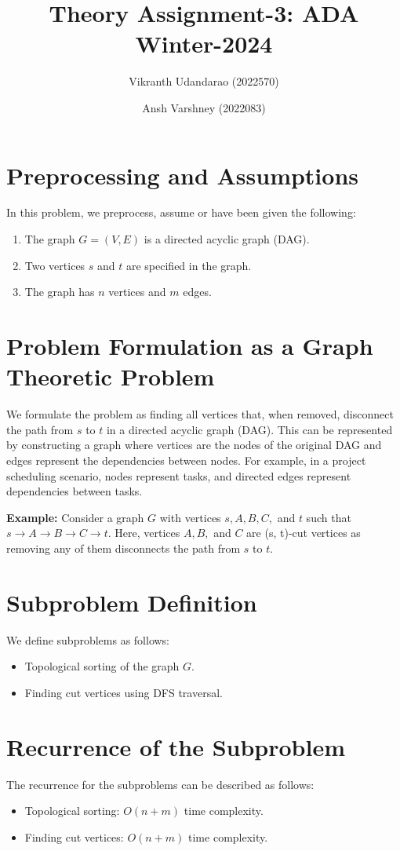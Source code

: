 \documentclass{article}
\title{Theory Assignment-3: ADA Winter-2024}
\author{Vikranth Udandarao (2022570) \and Ansh Varshney (2022083)}
\date{}
\begin{document}
\maketitle

\section{Preprocessing and Assumptions}
In this problem, we preprocess, assume or have been given the following:

\begin{enumerate}
    \item The graph $G = (V, E)$ is a directed acyclic graph (DAG).
    \item Two vertices $s$ and $t$ are specified in the graph.
    \item The graph has $n$ vertices and $m$ edges.
\end{enumerate}

\section{Problem Formulation as a Graph Theoretic Problem}
We formulate the problem as finding all vertices that, when removed, disconnect the path from $s$ to $t$ in a directed acyclic graph (DAG). This can be represented by constructing a graph where vertices are the nodes of the original DAG and edges represent the dependencies between nodes. For example, in a project scheduling scenario, nodes represent tasks, and directed edges represent dependencies between tasks.

\textbf{Example:} Consider a graph $G$ with vertices $s, A, B, C,$ and $t$ such that $s \rightarrow A \rightarrow B \rightarrow C \rightarrow t$. Here, vertices $A, B,$ and $C$ are (s, t)-cut vertices as removing any of them disconnects the path from $s$ to $t$.

\section{Subproblem Definition}
We define subproblems as follows:
\begin{itemize}
    \item Topological sorting of the graph $G$.
    \item Finding cut vertices using DFS traversal.
\end{itemize}

\section{Recurrence of the Subproblem}
The recurrence for the subproblems can be described as follows:
\begin{itemize}
    \item Topological sorting: $O(n + m)$ time complexity.
    \item Finding cut vertices: $O(n + m)$ time complexity.
\end{itemize}
\end{document}
